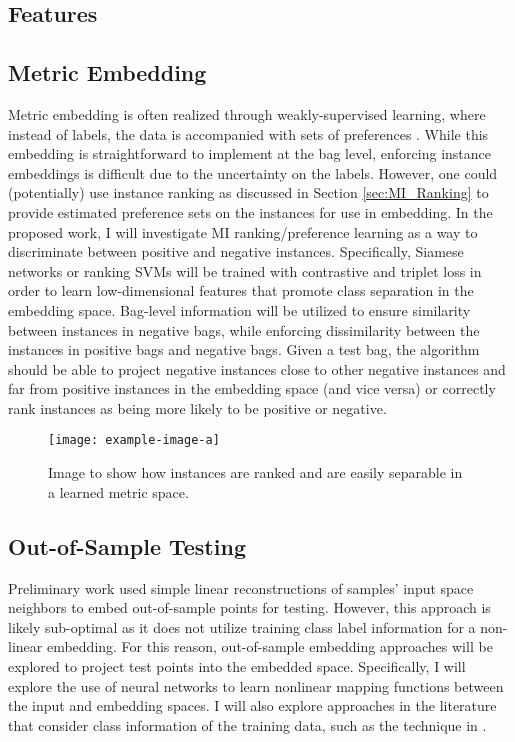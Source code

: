 \subsection{Features}

\subsection{Metric Embedding}
Metric embedding is often realized through weakly-supervised learning, where instead of labels, the data is accompanied with sets of preferences \citep{Hermans2017DefenseTripletLoss,Koch2015SiameseNetworks,Schroff2015FaceNet}. While this embedding is straightforward to implement at the bag level, enforcing instance embeddings is difficult due to the uncertainty on the labels.  However, one could (potentially) use instance ranking as discussed in Section \ref{sec:MI_Ranking} to provide estimated preference sets on the instances for use in embedding.  In the proposed work, I will investigate MI ranking/preference learning as a way to discriminate between positive and negative instances.  Specifically, Siamese networks or ranking SVMs will be trained with contrastive and triplet loss in order to learn low-dimensional features that promote class separation in the embedding space.  Bag-level information will be utilized to ensure similarity between instances in negative bags, while enforcing dissimilarity between the instances in positive bags and negative bags.  Given a test bag, the algorithm should be able to project negative instances close to other negative instances and far from positive instances in the embedding space (and vice versa) or correctly rank instances as being more likely to be positive or negative.

\begin{center}
	\begin{figure*}[h]
		\centering
		\texttt{[image: example-image-a]}
		\caption[Proposed metric embedding]{Image to show how instances are ranked and are easily separable in a learned metric space.}
		\label{fig:proposed_metric_embedding}
	\end{figure*}
\end{center}

\subsection{Out-of-Sample Testing}
Preliminary work used simple linear reconstructions of  samples' input space neighbors to embed out-of-sample points for testing.  However, this approach is likely sub-optimal as it does not utilize training class label information for a non-linear embedding.  For this reason, out-of-sample embedding approaches will be explored to project test points into the embedded space.  Specifically, I will explore the use of neural networks to learn nonlinear mapping functions between the input and embedding spaces.  I will also explore  approaches in the literature that consider class information of the training data, such as the technique in \citep{Vural2016OutOfSampleSupManifoldLearning}. 

